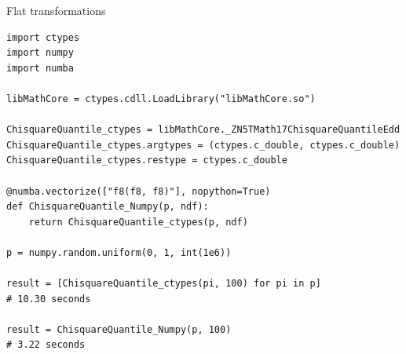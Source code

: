 \documentclass{beamer}
\begin{document}
\begin{frame}[fragile]{Flat transformations}
\scriptsize
\begin{verbatim}
import ctypes
import numpy
import numba

libMathCore = ctypes.cdll.LoadLibrary("libMathCore.so")

ChisquareQuantile_ctypes = libMathCore._ZN5TMath17ChisquareQuantileEdd
ChisquareQuantile_ctypes.argtypes = (ctypes.c_double, ctypes.c_double)
ChisquareQuantile_ctypes.restype = ctypes.c_double

@numba.vectorize(["f8(f8, f8)"], nopython=True)
def ChisquareQuantile_Numpy(p, ndf):
    return ChisquareQuantile_ctypes(p, ndf)

p = numpy.random.uniform(0, 1, int(1e6))

result = [ChisquareQuantile_ctypes(pi, 100) for pi in p]
# 10.30 seconds

result = ChisquareQuantile_Numpy(p, 100)
# 3.22 seconds
\end{verbatim}
\end{frame}
\end{document}
